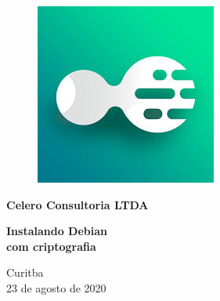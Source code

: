 \begin{titlepage}

  \begin{figure}[!ht]
    \filcenter
    \includegraphics[height=0.33\textheight, width=0.33\linewidth, keepaspectratio]{imagens/celero_logo.jpeg}
  \end{figure}
  \vspace{-2.5em}
  \begin{Large}
      \begin{center}
        \textbf{Celero Consultoria LTDA}
  
        \vfill
  
        \textbf{Instalando Debian\\
        com criptografia
      }
    \end{center}

    \vfill
    
    \begin{center}
      Curitba\\
      23 de agosto de 2020
    \end{center}
  \end{Large}

  \clearpage
\end{titlepage}